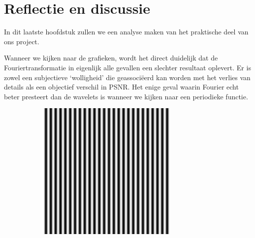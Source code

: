\chapter{Reflectie en discussie}
In dit laatste hoofdstuk zullen we een analyse maken van het praktische deel van ons project.

Wanneer we kijken naar de grafieken, wordt het direct duidelijk dat de Fouriertransformatie in eigenlijk alle gevallen een slechter resultaat oplevert. Er is zowel een subjectieve `wolligheid' die geassoci\"eerd kan worden met het verlies
van details als een objectief verschil in PSNR. Het enige geval waarin Fourier echt beter presteert dan de wavelets is wanneer we kijken naar een periodieke functie.
\begin{figure}[h]
  \centering
  \begin{subfigure}[b]{0.25\textwidth}
    \centering
    \includegraphics[width=\textwidth]{plaatjes/sin_fourier.png}
  \end{subfigure}
  \begin{subfigure}[b]{0.25\textwidth}
    \centering

\end{subfigure}
\end{figure}
